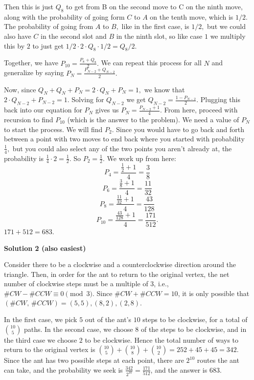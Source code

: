 \begin{enumerate}
 Then this is just $Q_{8}$ to get from B on the second move to C on the ninth move, along with the probability of going form $C$ to $A$ on the tenth move, which is $1/2.$ The probability of going from $A$ to $B,$ like in the first case, is $1/2,$ but we could also have $C$ in the second slot and $B$ in the ninth slot, so like case $1$ we multiply this by $2$ to just get $1/2 \cdot 2 \cdot Q_{8} \cdot 1/2 = Q_{8}/2.$ 

 Together, we have $P_{10} = \frac{P_{8} + Q_{8}}{2}.$ We can repeat this process for all $N$ and generalize by saying $P_{N} = \frac{P_{N-2} + Q_{N-2}}{2}.$

 Now, since $Q_{N} + Q_{N} + P_{N} = 2 \cdot Q_{N} + P_{N} = 1,$ we know that $2 \cdot Q_{N-2} + P_{N-2} = 1.$ Solving for $Q_{N-2}$ we get $Q_{N-2} = \frac{1 - P_{N-2}}{2}.$ Plugging this back into our equation for $P_{N}$ gives us $P_{N} = \frac{P_{N-2} + 1}{4}.$ From here, proceed with recursion to find $P_{10}$ (which is the answer to the problem). We need a value of $P_{N}$ to start the process. We will find $P_{2}.$ Since you would have to go back and forth between a point with two moves to end back where you started with probability $\frac{1}{4},$ but you could also select any of the two points you aren't already at, the probability is $\frac{1}{4} \cdot 2 = \frac{1}{2}.$ So $P_{2} = \frac{1}{2}.$ We work up from here: 
 \[P_{4} = \frac{\frac{1}{2} + 1}{4} = \frac{3}{8}\]
 \[P_{6} = \frac{\frac{3}{8} + 1}{4} = \frac{11}{32}\] 
 \[P_{8} = \frac{\frac{11}{32} + 1}{4} = \frac{43}{128}\] 
 \[P_{10} = \frac{\frac{43}{128} + 1}{4} = \boxed{\frac{171}{512}}.\]
$171 + 512 = \boxed{683}.$




\textbf{Solution 2 (also easiest)}

Consider there to be a clockwise and a counterclockwise direction around the triangle.  Then, in order for the ant to return to the original vertex, the net number of clockwise steps must be a multiple of 3, i.e., $\#CW - \#CCW \equiv 0 \pmod{3}$.  Since $\#CW + \#CCW = 10$, it is only possible that $(\#CW,\, \#CCW) = (5,5), (8,2), (2,8)$.

 In the first case, we pick $5$ out of the ant's $10$ steps to be clockwise, for a total of ${10 \choose 5}$ paths.  In the second case, we choose $8$ of the steps to be clockwise, and in the third case we choose $2$ to be clockwise.  Hence the total number of ways to return to the original vertex is ${10 \choose 5} + {10 \choose 8} + {10 \choose 2} = 252 + 45 + 45 = 342$.  Since the ant has two possible steps at each point, there are $2^{10}$ routes the ant can take, and the probability we seek is $\frac{342}{2^{10}} = \frac{171}{512}$, and the answer is $\boxed{683}$.


\end{enumerate}
